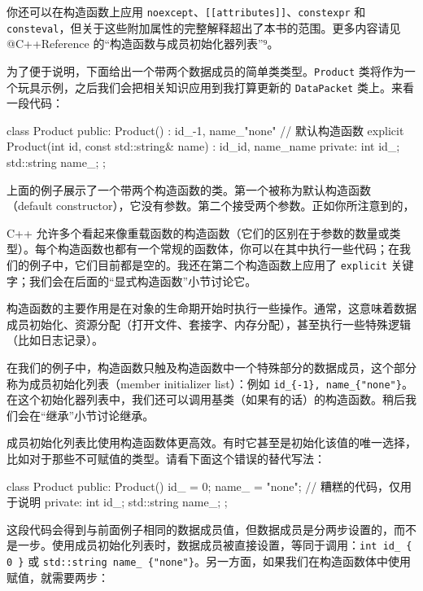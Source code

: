 \begin{myInfoBox}
你还可以在构造函数上应用 \texttt{noexcept}、\texttt{[[attributes]]}、\texttt{constexpr} 和 \texttt{consteval}，但关于这些附加属性的完整解释超出了本书的范围。更多内容请见 @C++Reference 的“构造函数与成员初始化器列表”⁹。
\end{myInfoBox}


为了便于说明，下面给出一个带两个数据成员的简单类类型。\texttt{Product} 类将作为一个玩具示例，之后我们会把相关知识应用到我打算更新的 \texttt{DataPacket} 类上。来看一段代码：

\begin{codebox}[cpp]
class Product {
public:
Product() : id_{-1}, name_{"none"} { } // 默认构造函数
explicit Product(int id, const std::string& name)
: id_{id}, name_{name} { }
private:
int id_;
std::string name_;
};
\end{codebox}

上面的例子展示了一个带两个构造函数的类。第一个被称为默认构造函数（default constructor），它没有参数。第二个接受两个参数。正如你所注意到的，


C++ 允许多个看起来像重载函数的构造函数（它们的区别在于参数的数量或类型）。每个构造函数也都有一个常规的函数体，你可以在其中执行一些代码；在我们的例子中，它们目前都是空的。我还在第二个构造函数上应用了 \texttt{explicit} 关键字；我们会在后面的“显式构造函数”小节讨论它。

构造函数的主要作用是在对象的生命期开始时执行一些操作。通常，这意味着数据成员初始化、资源分配（打开文件、套接字、内存分配），甚至执行一些特殊逻辑（比如日志记录）。

在我们的例子中，构造函数只触及构造函数中一个特殊部分的数据成员，这个部分称为成员初始化列表（member initializer list）：例如 \texttt{id\_\{-1\}, name\_\{"none"\}}。在这个初始化器列表中，我们还可以调用基类（如果有的话）的构造函数。稍后我们会在“继承”小节讨论继承。

成员初始化列表比使用构造函数体更高效。有时它甚至是初始化该值的唯一选择，比如对于那些不可赋值的类型。请看下面这个错误的替代写法：

\begin{codebox}[cpp]
class Product {
public:
Product() { id_ = 0; name_ = "none"; } // 糟糕的代码，仅用于说明
private:
int id_;
std::string name_;
};
\end{codebox}

这段代码会得到与前面例子相同的数据成员值，但数据成员是分两步设置的，而不是一步。使用成员初始化列表时，数据成员被直接设置，等同于调用：\texttt{int id\_ \{ 0 \}} 或 \texttt{std::string name\_ \{"none"\}}。另一方面，如果我们在构造函数体中使用赋值，就需要两步：

